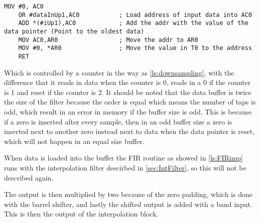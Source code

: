 \begin{lstlisting}[language={[x86masm]Assembler}, caption = {Downsampling.},label={ls:zero}]
	MOV #0, AC0
	OR #dataInUp1,AC0			; Load address of input data into AC0
	ADD *(#iUp1),AC0			; Add the addr with the value of the data pointer (Point to the oldest data)
	MOV AC0,AR0					; Move the addr to AR0
	MOV #0, *AR0				; Move the value in T0 to the address
	RET
\end{lstlisting}
Which is controlled by a counter in the way as \autoref{ls:downsampling}, with the difference that it reads in data when the counter is 0, reads in a 0 if the counter is 1 and reset if the counter is 2. It should be noted that the data buffer is twice the size of the filter because the order is equal which means the number of taps is odd, which result in an error in memory if the buffer size is odd. This is because if a zero is inserted after every sample, then in an odd buffer size a zero is inserted next to another zero instead next to data when the data pointer is reset, which will not happen in an equal size buffer. 

When data is loaded into the buffer the FIR routine as showed in \autoref{ls:FIRimp} runs with the interpolation filter descirbed in \autoref{sec:IntFilter}, so this will not be described again. 

The output is then multiplied by two because of the zero padding, which is done with the barrel shifter, and lastly the shifted output is added with a band input. This is then the output of the interpolation block.



